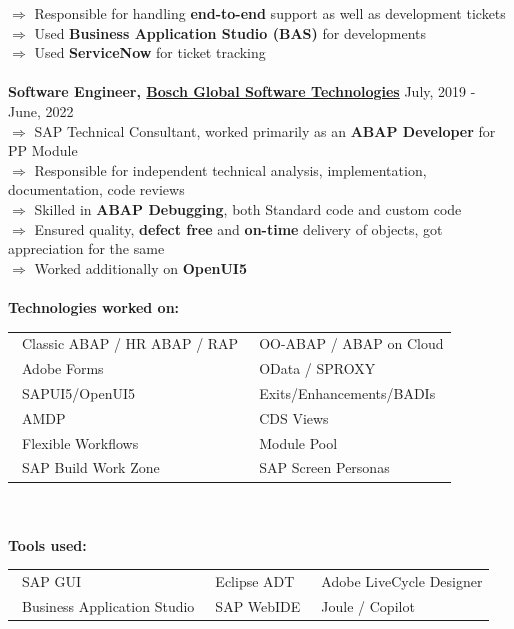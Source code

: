 \documentclass[margin, centered, a4paper]{res}
\begin{document}
\begin{resume}
$\Rightarrow$ Responsible for handling \textbf{end-to-end} support as well as development tickets\\
$\Rightarrow$ Used \textbf{Business Application Studio (BAS)} for developments\\
$\Rightarrow$ Used \textbf{ServiceNow} for ticket tracking\\
\\
\textbf{Software Engineer, \href{https://www.linkedin.com/company/bosch-global-software-technologies/}{Bosch Global Software Technologies}} \hfill{July, 2019 - June, 2022}\\
$\Rightarrow$ SAP Technical Consultant, worked primarily as an \textbf{ABAP Developer} for PP Module\\
$\Rightarrow$ Responsible for independent technical analysis, implementation, documentation, code reviews\\
$\Rightarrow$ Skilled in \textbf{ABAP Debugging}, both Standard code and custom code\\
$\Rightarrow$ Ensured quality, \textbf{defect free} and \textbf{on-time} delivery of objects, got appreciation for the same\\
$\Rightarrow$ Worked additionally on \textbf{OpenUI5}\\
\\
\textbf{Technologies worked on:} \begin{tabular}{ l l }
	\textbullet~Classic ABAP / HR ABAP / RAP & \textbullet~OO-ABAP / ABAP on Cloud\\
	\textbullet~Adobe Forms & \textbullet~OData / SPROXY\\
	\textbullet~SAPUI5/OpenUI5 & \textbullet~Exits/Enhancements/BADIs\\
	\textbullet~AMDP & \textbullet~CDS Views\\
	\textbullet~Flexible Workflows & \textbullet~Module Pool\\
	\textbullet~SAP Build Work Zone & \textbullet~SAP Screen Personas\\
\end{tabular}\\
\\
\textbf{Tools used:} \begin{tabular}{ l l l }
	\textbullet~SAP GUI & \textbullet~Eclipse ADT & \textbullet~Adobe LiveCycle Designer\\
	\textbullet~Business Application Studio & \textbullet~SAP WebIDE & \textbullet~Joule / Copilot\\

\end{tabular}
\end{resume}
\end{document}
